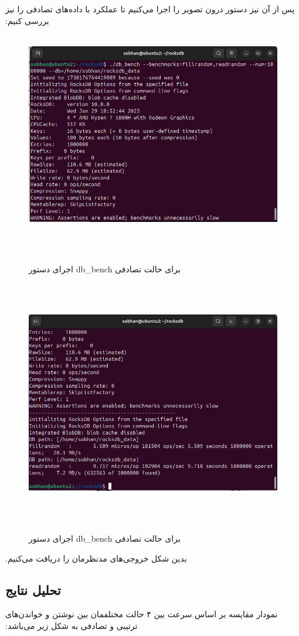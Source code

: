 ‫
‫پس از آن نیز دستور درون تصویر را اجرا می‌کنیم تا عملکرد با داده‌های تصادفی را نیز بررسی کنیم:
‫
‫\begin{figure}[H]
‫    \centering
‫    \includegraphics[width=\textwidth]{figs/8.png}
‫    \caption{اجرای دستور db\_bench برای حالت تصادفی}
‫\end{figure}
‫
‫\begin{figure}[H]
‫    \centering
‫    \includegraphics[width=\textwidth]{figs/9.png}
‫    \caption{اجرای دستور db\_bench برای حالت تصادفی}
‫\end{figure}
‫
‫بدین شکل خروجی‌های مدنظرمان را دریافت می‌کنیم.
‫
‫‫\subsection*{تحلیل نتایج}
‫نمودار مقایسه بر اساس سرعت بین ۴ حالت مختلفمان بین نوشتن و خواندن‌های ترتیبی و تصادفی به شکل زیر می‌باشد:
